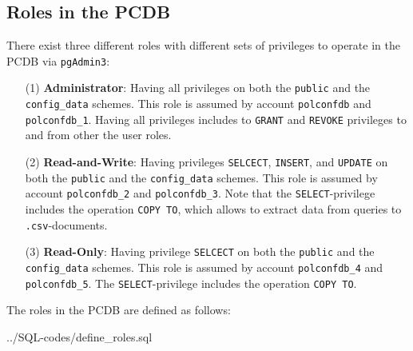 \subsection{Roles in the PCDB}\label{subsec_query_roles}
There exist three different roles with different sets of privileges to operate in the PCDB via \texttt{\footnotesize pgAdmin3}:
\begin{itemize}
\item[(1)]{{\bf Administrator}: Having all privileges on both the \texttt{\footnotesize public} and the \texttt{\footnotesize config\_data} schemes. 
This role is assumed by account \texttt{\footnotesize polconfdb} and \texttt{\footnotesize polconfdb\_1}. 
Having all privileges includes to \texttt{\footnotesize GRANT} and \texttt{\footnotesize REVOKE} privileges to and from other the user roles.}

\item[(2)]{{\bf Read-and-Write}: Having privileges  \texttt{\footnotesize SELCECT},  \texttt{\footnotesize INSERT}, and  \texttt{\footnotesize UPDATE} on both the \texttt{\footnotesize public} and the \texttt{\footnotesize config\_data} schemes. 
This role is assumed by account \texttt{\footnotesize polconfdb\_2} and \texttt{\footnotesize polconfdb\_3}.
Note that the  \texttt{\footnotesize SELECT}-privilege includes the operation  \texttt{\footnotesize COPY TO}, which allows to extract data from queries to  \texttt{\footnotesize .csv}-documents.}

\item[(3)]{{\bf Read-Only}: Having privilege \texttt{\footnotesize SELCECT} on both the \texttt{\footnotesize public} and the \texttt{\footnotesize config\_data} schemes. 
This role is assumed by account \texttt{\footnotesize polconfdb\_4} and \texttt{\footnotesize polconfdb\_5}.
The \texttt{\footnotesize SELECT}-privilege includes the operation  \texttt{\footnotesize COPY TO}.}
\end{itemize}

The roles in the PCDB are defined as follows:

%
{../SQL-codes/define_roles.sql}